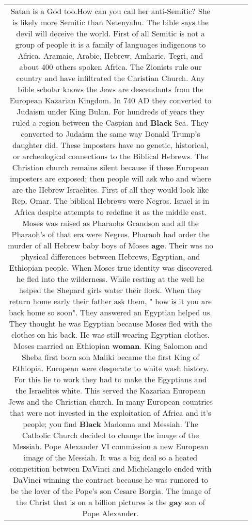\documentclass[11pt]{article}
\newlength\mylength
\begin{document}
\begin{center}
\begin{longtable}{|C{.65\mylength}|C{.30\mylength}|C{.12\mylength}|C{.12\mylength}|C{.12\mylength}|}
  \small Satan is a God too.How can you call her anti-Semitic? She is likely more Semitic than Netenyahu. The bible says the devil will deceive the world. First of all Semitic is not a group of people it is a family of languages indigenous to Africa. Aramaic, Arabic, Hebrew, Amharic, Tegri, and about 400 others spoken Africa.
The Zionists rule our country and have infiltrated the Christian Church. Any bible scholar knows the Jews are descendants from the European Kazarian Kingdom. In 740 AD they converted to Judaism under King Bulan. For hundreds of years they ruled a region between the Caspian and \textbf{Black} Sea. They converted to Judaism the same way Donald Trump's daughter did. These imposters have no genetic, historical, or archeological connections to the Biblical Hebrews. 
The Christian church remains silent because if these European imposters are exposed; then people will ask who and where are the Hebrew Israelites.
First of all they would look like Rep. Omar. The biblical Hebrews were Negros. Israel is in Africa despite attempts to redefine it as the middle east. 
Moses was raised as Pharaohs Grandson and all the Pharaoh's of that era were Negros. Pharaoh had order the murder of all Hebrew baby boys of Moses \textbf{age}. Their was no physical differences between Hebrews, Egyptian, and Ethiopian people. When Moses true identity was discovered he fled into the wilderness. While resting at the well he helped the Shepard girls water their flock. When they return home early their father ask them, " how is it you are back home so soon". They answered an Egyptian helped us. They thought he was Egyptian because Moses fled with the clothes on his back. He was still wearing Egyptian clothes. Moses married an Ethiopian \textbf{woman}. King Salomon and Sheba first born son Maliki became the first King of Ethiopia. 
European were desperate to white wash history. For this lie to work they had to make the Egyptians and the Israelites white. This served the Kazarian European Jews and the Christian church. In many European countries that were not invested in the exploitation of Africa and it's people; you find \textbf{Black} Madonna and Messiah.
The Catholic Church decided to change the image of the Messiah. Pope Alexander VI commission a new European image of the Messiah. It was a big deal so a heated competition between DaVinci and Michelangelo ended with DaVinci winning the contract because he was rumored to be the lover of the Pope's son Cesare Borgia. The image of the Christ that is on a billion pictures is the \textbf{g\textbf{ay}} son of Pope Alexander. 

\end{longtable}
\end{center}
\end{document}
